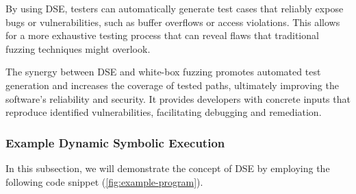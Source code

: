 By using DSE, testers can automatically generate test cases that reliably expose bugs or vulnerabilities, such as buffer overflows or access violations. This allows for a more exhaustive testing process that can reveal flaws that traditional fuzzing techniques might overlook.

The synergy between DSE and white-box fuzzing promotes automated test generation and increases the coverage of tested paths, ultimately improving the software's reliability and security. It provides developers with concrete inputs that reproduce identified vulnerabilities, facilitating debugging and remediation.



\subsubsection{Example Dynamic Symbolic Execution}
In this subsection, we will demonstrate the concept of DSE by employing the following code snippet (\autoref{fig:example-program}). 


\vspace{0.5cm}

